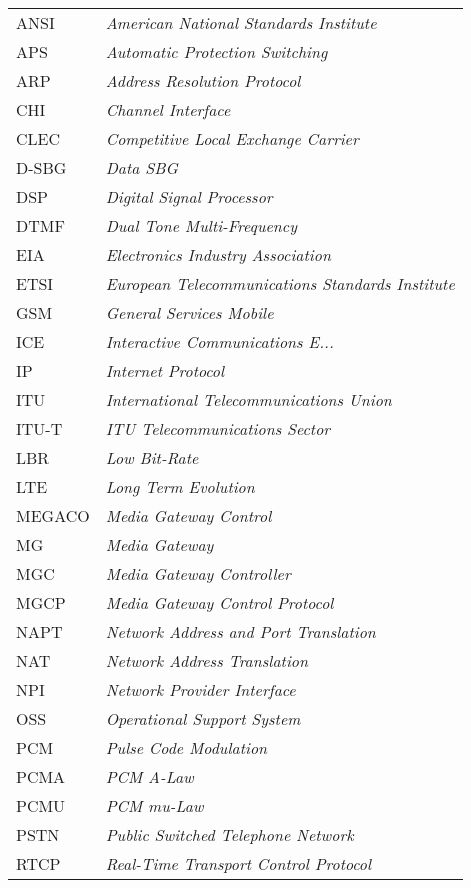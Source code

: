 \documentclass[letterpaper,final,notitlepage,twocolumn,10pt,twoside]{article}
\begin{document}
\setlength{\tabcolsep}{0.2em}
\setlength{\arraycolsep}{0.2em}
\begin{tabular}{ll}\\
ANSI   & {\it American National Standards Institute}\\
APS    & {\it Automatic Protection Switching}\\
ARP    & {\it Address Resolution Protocol}\\
CHI    & {\it Channel Interface} \cite[]{CHI}\\
CLEC   & {\it Competitive Local Exchange Carrier}\\
D-SBG  & {\it Data SBG}\\
DSP    & {\it Digital Signal Processor}\\
DTMF   & {\it Dual Tone Multi-Frequency}\\
EIA    & {\it Electronics Industry Association}\\
ETSI   & {\it European Telecommunications Standards Institute}\\
GSM    & {\it General Services Mobile}\\
ICE    & {\it Interactive Communications E...}\\
IP     & {\it Internet Protocol}\\
ITU    & {\it International Telecommunications Union}\\
ITU-T  & {\it ITU Telecommunications Sector}\\
LBR    & {\it Low Bit-Rate}\\
LTE    & {\it Long Term Evolution}\\
MEGACO & {\it Media Gateway Control}\\
MG     & {\it Media Gateway}\\
MGC    & {\it Media Gateway Controller}\\
MGCP   & {\it Media Gateway Control Protocol}\\
NAPT   & {\it Network Address and Port Translation}\\
NAT    & {\it Network Address Translation}\\
NPI    & {\it Network Provider Interface} \cite[]{NPI}\\
OSS    & {\it Operational Support System}\\
PCM    & {\it Pulse Code Modulation}\\
PCMA   & {\it PCM A-Law}\\
PCMU   & {\it PCM mu-Law}\\
PSTN   & {\it Public Switched Telephone Network}\\
RTCP   & {\it Real-Time Transport Control Protocol}\\

\end{tabular}
\end{document}
